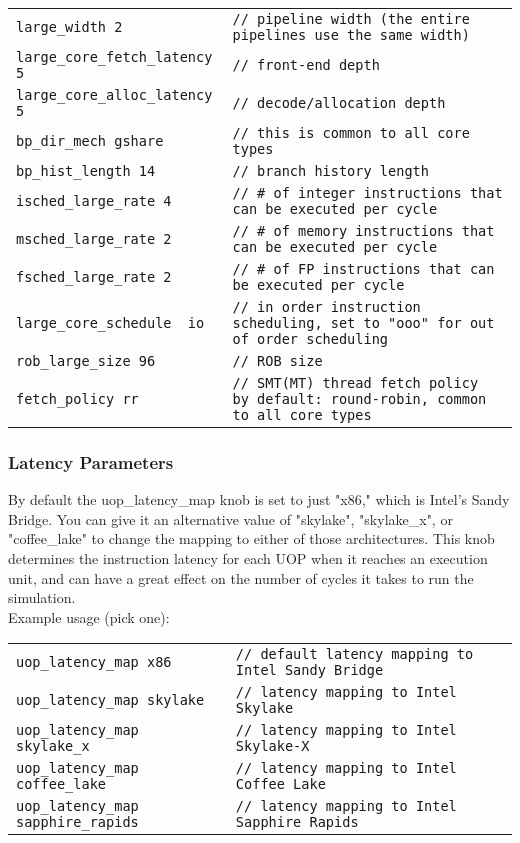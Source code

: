 \begin{tabular}{l l}
 \Verb+large_width 2+ & \Verb+// pipeline width (the entire pipelines use the same width)+ \\
 \Verb+large_core_fetch_latency 5+ & \Verb+// front-end depth+ \\
 \Verb+large_core_alloc_latency 5+ & \Verb+// decode/allocation depth+ \\
 \Verb+bp_dir_mech gshare+ & \Verb+// this is common to all core types+ \\
 \Verb+bp_hist_length 14+ & \Verb+// branch history length+ \\
 \Verb+isched_large_rate 4 + & \Verb+// # of integer instructions that can be executed per cycle+ \\
 \Verb+msched_large_rate 2+ & \Verb+// # of memory instructions that can be executed per cycle + \\
 \Verb+fsched_large_rate 2 + & \Verb+// # of FP instructions that can be executed per cycle+ \\
 \Verb+large_core_schedule  io + & \Verb+// in order instruction scheduling, set to "ooo" for out of order scheduling + \\
 \Verb+rob_large_size 96+ & \Verb+// ROB size+ \\
 \Verb+fetch_policy rr+ & \Verb+// SMT(MT) thread fetch policy  by default: round-robin, common to all core types+
\end{tabular}

\subsubsection{\cpu Latency Parameters}

By default the uop\_latency\_map knob is set to just "x86," which is Intel's Sandy Bridge. You can give it 
an alternative value of "skylake", "skylake\_x", or "coffee\_lake" to change the mapping to either of those architectures.
This knob determines the instruction latency for each UOP when it reaches an execution unit, and can have a great effect
on the number of cycles it takes to run the simulation.
\\
\noindent Example usage (pick one):

\begin{tabular}{l l}
 \Verb+uop_latency_map x86+ & \Verb+// default latency mapping to Intel Sandy Bridge+ \\
 \Verb+uop_latency_map skylake+ & \Verb+// latency mapping to Intel Skylake+ \\
 \Verb+uop_latency_map skylake_x+ & \Verb+// latency mapping to Intel Skylake-X+ \\
 \Verb+uop_latency_map coffee_lake+ & \Verb+// latency mapping to Intel Coffee Lake+ \\
 \Verb+uop_latency_map sapphire_rapids+ & \Verb+// latency mapping to Intel Sapphire Rapids+ 
\end{tabular}

